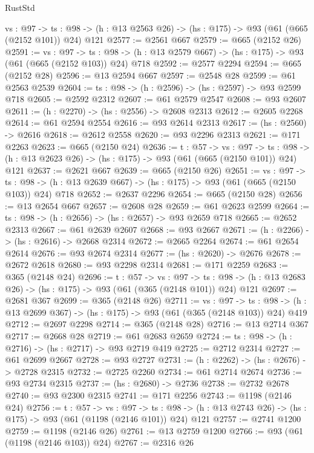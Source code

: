 \begin{lexlean}{RustStd}
\begin{coremodule}
  {vs : @97} ->
  {ts : @98} -> (h : @13 @2563 @26) -> (hs : @175) -> @93 (@61 (@665 (@2152 @101)) @24) @121
@2577 := @2561 @667
@2579 := @665 (@2152 @26)
@2591 := {vs : @97} ->
  {ts : @98} -> (h : @13 @2579 @667) -> (hs : @175) -> @93 (@61 (@665 (@2152 @103)) @24) @718
@2592 := @2577 @2294
@2594 := @665 (@2152 @28)
@2596 := @13 @2594 @667
@2597 := @2548 @28
@2599 := @61 @2563 @2539
@2604 := {ts : @98} -> (h : @2596) -> (hs : @2597) -> @93 @2599 @718
@2605 := @2592 @2312
@2607 := @61 @2579 @2547
@2608 := @93 @2607
@2611 := (h : @2270) -> (hs : @2556) -> @2608 @2313
@2612 := @2605 @2268
@2614 := @61 @2594 @2554
@2616 := @93 @2614 @2313
@2617 := (hs : @2560) -> @2616
@2618 := @2612 @2558
@2620 := @93 @2296 @2313
@2621 := @171 @2263
@2623 := @665 (@2150 @24)
@2636 := {t : @57} ->
  {vs : @97} ->
  {ts : @98} -> (h : @13 @2623 @26) -> (hs : @175) -> @93 (@61 (@665 (@2150 @101)) @24) @121
@2637 := @2621 @667
@2639 := @665 (@2150 @26)
@2651 := {vs : @97} ->
  {ts : @98} -> (h : @13 @2639 @667) -> (hs : @175) -> @93 (@61 (@665 (@2150 @103)) @24) @718
@2652 := @2637 @2296
@2654 := @665 (@2150 @28)
@2656 := @13 @2654 @667
@2657 := @2608 @28
@2659 := @61 @2623 @2599
@2664 := {ts : @98} -> (h : @2656) -> (hs : @2657) -> @93 @2659 @718
@2665 := @2652 @2313
@2667 := @61 @2639 @2607
@2668 := @93 @2667
@2671 := (h : @2266) -> (hs : @2616) -> @2668 @2314
@2672 := @2665 @2264
@2674 := @61 @2654 @2614
@2676 := @93 @2674 @2314
@2677 := (hs : @2620) -> @2676
@2678 := @2672 @2618
@2680 := @93 @2298 @2314
@2681 := @171 @2259
@2683 := @365 (@2148 @24)
@2696 := {t : @57} ->
  {vs : @97} ->
  {ts : @98} -> (h : @13 @2683 @26) -> (hs : @175) -> @93 (@61 (@365 (@2148 @101)) @24) @121
@2697 := @2681 @367
@2699 := @365 (@2148 @26)
@2711 := {vs : @97} ->
  {ts : @98} -> (h : @13 @2699 @367) -> (hs : @175) -> @93 (@61 (@365 (@2148 @103)) @24) @419
@2712 := @2697 @2298
@2714 := @365 (@2148 @28)
@2716 := @13 @2714 @367
@2717 := @2668 @28
@2719 := @61 @2683 @2659
@2724 := {ts : @98} -> (h : @2716) -> (hs : @2717) -> @93 @2719 @419
@2725 := @2712 @2314
@2727 := @61 @2699 @2667
@2728 := @93 @2727
@2731 := (h : @2262) -> (hs : @2676) -> @2728 @2315
@2732 := @2725 @2260
@2734 := @61 @2714 @2674
@2736 := @93 @2734 @2315
@2737 := (hs : @2680) -> @2736
@2738 := @2732 @2678
@2740 := @93 @2300 @2315
@2741 := @171 @2256
@2743 := @1198 (@2146 @24)
@2756 := {t : @57} ->
  {vs : @97} ->
  {ts : @98} -> (h : @13 @2743 @26) -> (hs : @175) -> @93 (@61 (@1198 (@2146 @101)) @24) @121
@2757 := @2741 @1200
@2759 := @1198 (@2146 @26)
@2761 := @13 @2759 @1200
@2766 := @93 (@61 (@1198 (@2146 @103)) @24)
@2767 := @2316 @26

\end{coremodule}
\end{lexlean}
